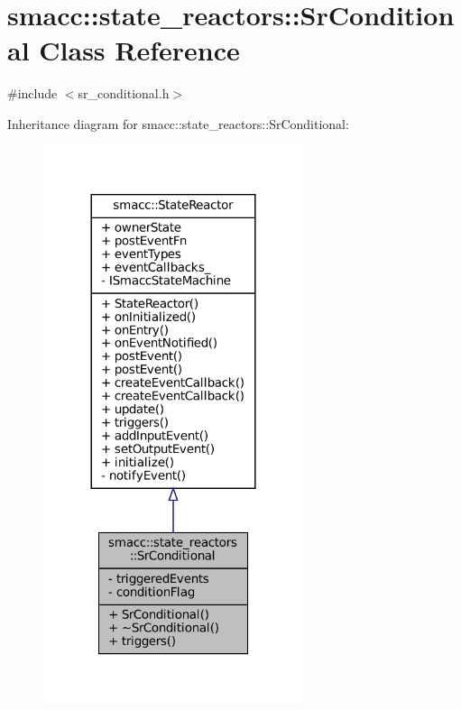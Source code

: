 \hypertarget{classsmacc_1_1state__reactors_1_1SrConditional}{}\section{smacc\+:\+:state\+\_\+reactors\+:\+:Sr\+Conditional Class Reference}
\label{classsmacc_1_1state__reactors_1_1SrConditional}


{\ttfamily \#include $<$sr\+\_\+conditional.\+h$>$}



Inheritance diagram for smacc\+:\+:state\+\_\+reactors\+:\+:Sr\+Conditional\+:
\nopagebreak
\begin{figure}[H]
\begin{center}
\leavevmode
\includegraphics[width=216pt]{classsmacc_1_1state__reactors_1_1SrConditional__inherit__graph}
\end{center}
\end{figure}


